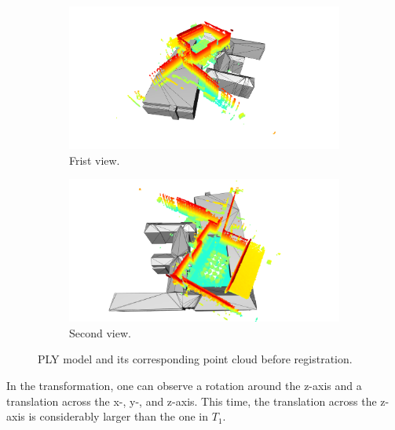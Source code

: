         \begin{figure}[H]
            \centering
            \begin{subfigure}{1\textwidth}
                \centering
                \includegraphics[scale=0.2]{images/solution_images/initial_ply_a.png}
                \caption{Frist view.}
                \label{fig:intial_ply_a}
            \end{subfigure}
            \hfill
            \begin{subfigure}{1\textwidth}
                \centering
                \includegraphics[scale=0.2]{images/solution_images/initial_ply_b.png}
                \caption{Second view.}
                \label{fig:intial_ply_b}
            \end{subfigure}
            \caption{PLY model and its corresponding point cloud before registration.}
            \label{fig:initial_ply}
        \end{figure}

        In the transformation, one can observe a rotation around the z-axis and a translation across the x-, y-, and z-axis.
        This time, the translation across the z-axis is considerably larger than the one in $T_1$.

